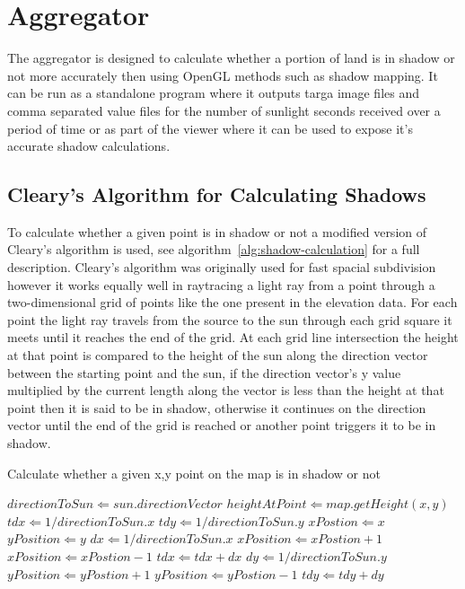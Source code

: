 \documentclass[12pt]{report}
\begin{document}
\chapter{Aggregator}

The aggregator is designed to calculate whether a portion of land is in shadow or not more accurately then using OpenGL methods such as shadow mapping. It can be run as a standalone program where it outputs targa image files and comma separated value files for the number of sunlight seconds received over a period of time or as part of the viewer where it can be used to expose it's accurate shadow calculations.

\section{Cleary's Algorithm for Calculating Shadows}
To calculate whether a given point is in shadow or not a modified version of Cleary's algorithm is used, see algorithm~\ref{alg:shadow-calculation} for a full description. Cleary's algorithm was originally used for fast spacial subdivision however it works equally well in raytracing a light ray from a point through a two-dimensional grid of points like the one present in the elevation data. For each point the light ray travels from the source to the sun through each grid square it meets until it reaches the end of the grid. At each grid line intersection the height at that point is compared to the height of the sun along the direction vector between the starting point and the sun, if the direction vector's y value multiplied by the current length along the vector is less than the height at that point then it is said to be in shadow, otherwise it continues on the direction vector until the end of the grid is reached or another point triggers it to be in shadow.

\begin{algorithm}[h]
\caption{Calculate whether a given x,y point on the map is in shadow or not}
\label{alg:shadow-calculation}%
\begin{algorithmic}           %
\STATE $directionToSun \Leftarrow sun.directionVector$
\STATE $heightAtPoint \Leftarrow map.getHeight(x,y)$
\STATE $tdx \Leftarrow 1 / directionToSun.x$
\STATE $tdy \Leftarrow 1 / directionToSun.y$
\STATE $xPostion \Leftarrow x$
\STATE $yPosition \Leftarrow y$
	\ENDIF
		\STATE $dx \Leftarrow 1 / directionToSun.x$
			\STATE $xPosition \Leftarrow xPostion + 1$	
		\ELSE
			\STATE $xPosition \Leftarrow xPostion - 1$	
		\ENDIF
		\STATE $tdx \Leftarrow tdx + dx$
	\ELSE
		\STATE $dy \Leftarrow 1 / directionToSun.y$
			\STATE $yPosition \Leftarrow yPostion + 1$	
		\ELSE
			\STATE $yPosition \Leftarrow yPostion - 1$	
		\ENDIF
		\STATE $tdy \Leftarrow tdy + dy$		
	\ENDIF
\ENDWHILE
{}
\end{algorithmic}
\end{algorithm}
\end{document}
